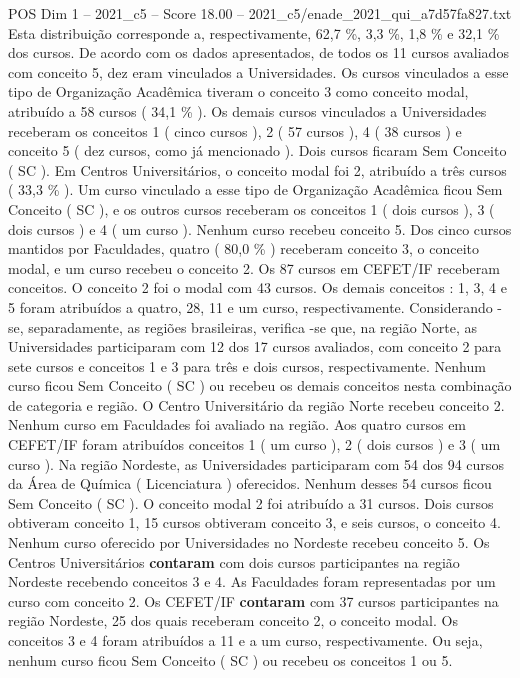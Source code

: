 \begin{textsample}{POS Dim 1 – 2021\_c5 – Score 18.00 – 2021\_c5/enade\_2021\_qui\_a7d57fa827.txt}
Esta distribuição corresponde a, respectivamente, 62,7 \%, 3,3 \%, 1,8 \% e 32,1 \% dos cursos.
De acordo com os dados apresentados, de todos os 11 cursos avaliados com conceito 5, dez eram vinculados a Universidades.
Os cursos vinculados a esse tipo de Organização Acadêmica tiveram o conceito 3 como conceito modal, atribuído a 58 cursos ( 34,1 \% ).
Os demais cursos vinculados a Universidades receberam os conceitos 1 ( cinco cursos ), 2 ( 57 cursos ), 4 ( 38 cursos ) e conceito 5 ( dez cursos, como já mencionado ).
Dois cursos ficaram Sem Conceito ( SC ).
Em Centros Universitários, o conceito modal foi 2, atribuído a três cursos ( 33,3 \% ).
Um curso vinculado a esse tipo de Organização Acadêmica ficou Sem Conceito ( SC ), e os outros cursos receberam os conceitos 1 ( dois cursos ), 3 ( dois cursos ) e 4 ( um curso ).
Nenhum curso recebeu conceito 5.
Dos cinco cursos mantidos por Faculdades, quatro ( 80,0 \% ) receberam conceito 3, o conceito modal, e um curso recebeu o conceito 2.
Os 87 cursos em CEFET/IF receberam conceitos.
O conceito 2 foi o modal com 43 cursos.
Os demais conceitos : 1, 3, 4 e 5 foram atribuídos a quatro, 28, 11 e um curso, respectivamente.
Considerando -se, separadamente, as regiões brasileiras, verifica -se que, na região Norte, as Universidades participaram com 12 dos 17 cursos avaliados, com conceito 2 para sete cursos e conceitos 1 e 3 para três e dois cursos, respectivamente.
Nenhum curso ficou Sem Conceito ( SC ) ou recebeu os demais conceitos nesta combinação de categoria e região.
O Centro Universitário da região Norte recebeu conceito 2.
Nenhum curso em Faculdades foi avaliado na região.
Aos quatro cursos em CEFET/IF foram atribuídos conceitos 1 ( um curso ), 2 ( dois cursos ) e 3 ( um curso ).
Na região Nordeste, as Universidades participaram com 54 dos 94 cursos da Área de Química ( Licenciatura ) oferecidos.
Nenhum desses 54 cursos ficou Sem Conceito ( SC ).
O conceito modal 2 foi atribuído a 31 cursos.
Dois cursos obtiveram conceito 1, 15 cursos obtiveram conceito 3, e seis cursos, o conceito 4.
Nenhum curso oferecido por Universidades no Nordeste recebeu conceito 5.
Os Centros Universitários \textbf{contaram} com dois cursos participantes na região Nordeste recebendo conceitos 3 e 4.
As Faculdades foram representadas por um curso com conceito 2.
Os CEFET/IF \textbf{contaram} com 37 cursos participantes na região Nordeste, 25 dos quais receberam conceito 2, o conceito modal.
Os conceitos 3 e 4 foram atribuídos a 11 e a um curso, respectivamente.
Ou seja, nenhum curso ficou Sem Conceito ( SC ) ou recebeu os conceitos 1 ou 5.

\end{textsample}
